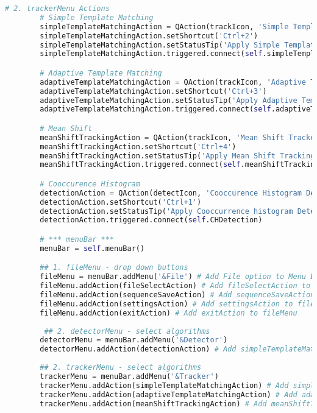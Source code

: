 \begin{lstlisting}[language=Python, caption={GUI Impementation Code}, captionpos=b, label={lst:gui}]
        # 2. trackerMenu Actions 
        # Simple Template Matching
        simpleTemplateMatchingAction = QAction(trackIcon, 'Simple Template Tracker', self)
        simpleTemplateMatchingAction.setShortcut('Ctrl+2')
        simpleTemplateMatchingAction.setStatusTip('Apply Simple Template Matching Algorithm')
        simpleTemplateMatchingAction.triggered.connect(self.simpleTemplateTracking)

        # Adaptive Template Matching
        adaptiveTemplateMatchingAction = QAction(trackIcon, 'Adaptive Template Tracker', self)
        adaptiveTemplateMatchingAction.setShortcut('Ctrl+3')
        adaptiveTemplateMatchingAction.setStatusTip('Apply Adaptive Template Matching Algorithm')
        adaptiveTemplateMatchingAction.triggered.connect(self.adaptiveTemplateTracking)

        # Mean Shift
        meanShiftTrackingAction = QAction(trackIcon, 'Mean Shift Tracker', self)
        meanShiftTrackingAction.setShortcut('Ctrl+4')
        meanShiftTrackingAction.setStatusTip('Apply Mean Shift Tracking Algorithm')
        meanShiftTrackingAction.triggered.connect(self.meanShiftTracking)

        # Cooccurence Histogram
        detectionAction = QAction(detectIcon, 'Cooccurence Histogram Detection', self)
        detectionAction.setShortcut('Ctrl+1')
        detectionAction.setStatusTip('Apply Cooccurrence histogram Detection')
        detectionAction.triggered.connect(self.CHDetection)

        # *** menuBar ***
        menuBar = self.menuBar() 

        ## 1. fileMenu - drop down buttons
        fileMenu = menuBar.addMenu('&File') # Add File option to Menu Bar
        fileMenu.addAction(fileSelectAction) # Add fileSelectAction to fileMenu 
        fileMenu.addAction(sequenceSaveAction) # Add sequenceSaveAction to fileMenu
        fileMenu.addAction(settingsAction) # Add settingsAction to fileMenu
        fileMenu.addAction(exitAction) # Add exitAction to fileMenu
        
         ## 2. detectorMenu - select algorithms
        detectorMenu = menuBar.addMenu('&Detector')
        detectorMenu.addAction(detectionAction) # Add simpleTemplateMatchingAction to trackerMenu
        
        ## 2. trackerMenu - select algorithms
        trackerMenu = menuBar.addMenu('&Tracker')
        trackerMenu.addAction(simpleTemplateMatchingAction) # Add simpleTemplateMatchingAction to trackerMenu
        trackerMenu.addAction(adaptiveTemplateMatchingAction) # Add adaptiveTemplateMatchingAction to trackerMenu
        trackerMenu.addAction(meanShiftTrackingAction) # Add meanShiftTracking to algorithmMenu
        

\end{lstlisting}

